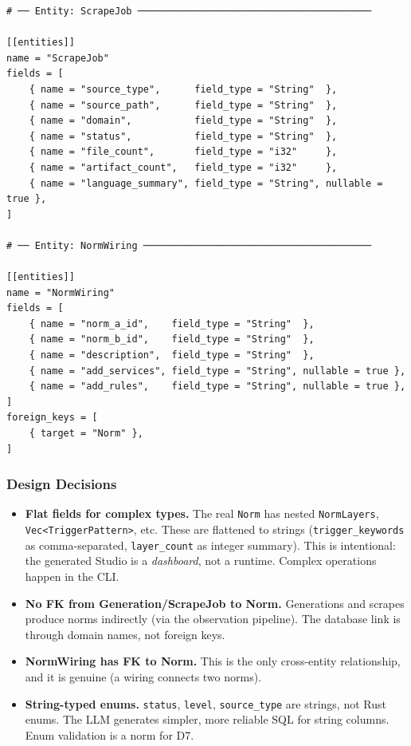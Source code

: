 \documentclass[11pt,a4paper]{article}
\begin{document}
\begin{lstlisting}[style=toml]
# ── Entity: ScrapeJob ─────────────────────────────────────────

[[entities]]
name = "ScrapeJob"
fields = [
    { name = "source_type",      field_type = "String"  },
    { name = "source_path",      field_type = "String"  },
    { name = "domain",           field_type = "String"  },
    { name = "status",           field_type = "String"  },
    { name = "file_count",       field_type = "i32"     },
    { name = "artifact_count",   field_type = "i32"     },
    { name = "language_summary", field_type = "String", nullable = true },
]

# ── Entity: NormWiring ────────────────────────────────────────

[[entities]]
name = "NormWiring"
fields = [
    { name = "norm_a_id",    field_type = "String"  },
    { name = "norm_b_id",    field_type = "String"  },
    { name = "description",  field_type = "String"  },
    { name = "add_services", field_type = "String", nullable = true },
    { name = "add_rules",    field_type = "String", nullable = true },
]
foreign_keys = [
    { target = "Norm" },
]
\end{lstlisting}

\subsubsection{Design Decisions}

\begin{itemize}[nosep]
\item \textbf{Flat fields for complex types.} The real \texttt{Norm} has
      nested \texttt{NormLayers}, \texttt{Vec<TriggerPattern>}, etc.
      These are flattened to strings (\texttt{trigger\_keywords} as
      comma-separated, \texttt{layer\_count} as integer summary).
      This is intentional: the generated Studio is a \emph{dashboard},
      not a runtime. Complex operations happen in the CLI.
\item \textbf{No FK from Generation/ScrapeJob to Norm.} Generations and
      scrapes produce norms indirectly (via the observation pipeline).
      The database link is through domain names, not foreign keys.
\item \textbf{NormWiring has FK to Norm.} This is the only cross-entity
      relationship, and it is genuine (a wiring connects two norms).
\item \textbf{String-typed enums.} \texttt{status}, \texttt{level},
      \texttt{source\_type} are strings, not Rust enums. The LLM
      generates simpler, more reliable SQL for string columns. Enum
      validation is a norm for D7.
\end{itemize}
\end{document}
